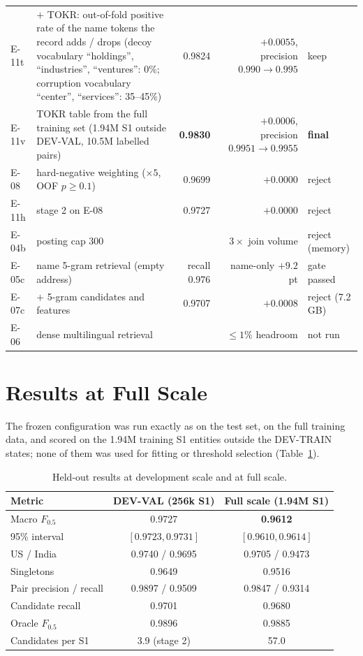 \documentclass[10pt]{article}
\newcommand{\Fh}{F_{0.5}}
\begin{document}
\begin{table}[htbp]
\begin{tabular}{@{}llrrl@{}}
E-11t & $+$ TOKR: out-of-fold positive rate of the name tokens the record adds / drops (decoy vocabulary ``holdings'', ``industries'', ``ventures'': 0\%; corruption vocabulary ``center'', ``services'': 35--45\%) & 0.9824 & $+0.0055$, precision $0.990 \to 0.995$ & keep \\
E-11v & TOKR table from the full training set (1.94M S1 outside DEV-VAL, 10.5M labelled pairs) & \textbf{0.9830} & $+0.0006$, precision $0.9951 \to 0.9955$ & \textbf{final} \\
E-08 & hard-negative weighting ($\times5$, OOF $p\ge0.1$) & 0.9699 & $+0.0000$ & reject \\
E-11h & stage 2 on E-08 & 0.9727 & $+0.0000$ & reject \\
E-04b & posting cap 300 & & $3\times$ join volume & reject (memory) \\
E-05c & name 5-gram retrieval (empty address) & recall 0.976 & name-only $+9.2$ pt & gate passed \\
E-07c & $+$ 5-gram candidates and features & 0.9707 & $+0.0008$ & reject (7.2 GB) \\
E-06 & dense multilingual retrieval & & $\le 1\%$ headroom & not run \\
\bottomrule
\end{tabular}
\end{table}

\section{Results at Full Scale}
The frozen configuration was run exactly as on the test set, on the full training data, and scored on the 1.94M training S1 entities outside the DEV-TRAIN states; none of them was used for fitting or threshold selection (Table~\ref{tab:full}).

\begin{table}[htbp]
\centering\small
\caption{Held-out results at development scale and at full scale.}
\label{tab:full}
\begin{tabular}{@{}lcc@{}}
\toprule
Metric & DEV-VAL (256k S1) & Full scale (1.94M S1) \\
\midrule
Macro $\Fh$ & 0.9727 & \textbf{0.9612} \\
95\% interval & $[0.9723, 0.9731]$ & $[0.9610, 0.9614]$ \\
US / India & 0.9740 / 0.9695 & 0.9705 / 0.9473 \\
Singletons & 0.9649 & 0.9516 \\
Pair precision / recall & 0.9897 / 0.9509 & 0.9847 / 0.9314 \\
Candidate recall & 0.9701 & 0.9680 \\
Oracle $\Fh$ & 0.9896 & 0.9885 \\
Candidates per S1 & 3.9 (stage 2) & 57.0 \\
\bottomrule
\end{tabular}
\end{table}
\end{document}

